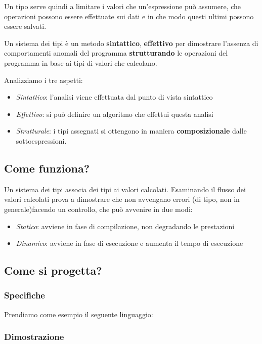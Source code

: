 \noindent Un tipo serve quindi a limitare i valori che un'espressione può assumere, che operazioni possono essere effettuate sui dati e in che modo questi ultimi possono essere salvati.

\begin{definition}
	Un sistema dei tipi è un metodo \textbf{sintattico}, \textbf{effettivo} per dimostrare
	l'assenza di comportamenti anomali del programma \textbf{strutturando} le
	operazioni del programma in base ai tipi di valori che calcolano.
\end{definition}
\noindent Analizziamo i tre aspetti:
\begin{itemize}
	\item \textit{Sintattico}:  l'analisi viene effettuata dal punto di vista sintattico
	\item \textit{Effettivo}: si può definire un algoritmo che effettui questa analisi
	\item \textit{Strutturale}: i tipi assegnati si ottengono in maniera \textbf{composizionale} dalle sottoespressioni.
\end{itemize}

\subsection{Come funziona?}
Un sistema dei tipi associa dei tipi ai valori calcolati. Esaminando il flusso dei valori calcolati prova a dimostrare che non avvengano errori (di tipo, non in generale)facendo un controllo, che può avvenire in due modi:
\begin{itemize}
	\item \textit{Statico}: avviene in fase di compilazione, non degradando le prestazioni
	\item  \textit{Dinamico}: avviene in fase di esecuzione e aumenta il tempo di esecuzione
\end{itemize}

\subsection{Come si progetta?}
\subsubsection{Specifiche}
Prendiamo come esempio il seguente linguaggio:
\subsubsection{Dimostrazione}
